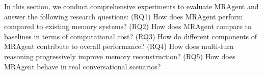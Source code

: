 \documentclass{llmxive}
\begin{document}



In this section, we conduct comprehensive experiments to evaluate MRAgent and answer the following research questions:
(RQ1) How does MRAgent perform compared to existing memory systems?
(RQ2) How does MRAgent compare to baselines in terms of computational cost?
(RQ3) How do different components of MRAgent contribute to overall performance?
(RQ4) How does multi-turn reasoning progressively improve memory reconstruction?
(RQ5) How does MRAgent behave in real conversational scenarios?
\end{document}
